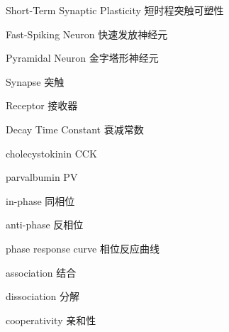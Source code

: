 \begin{denotation}

\item[Short-Term Synaptic Plasticity] 短时程突触可塑性
\item[Fast-Spiking Neuron] 快速发放神经元
\item[Pyramidal Neuron] 金字塔形神经元
\item[Synapse] 突触
\item[Receptor] 接收器
\item[Decay Time Constant] 衰减常数
\item[cholecystokinin] CCK
\item[parvalbumin] PV
\item[in-phase] 同相位
\item[anti-phase] 反相位
\item[phase response curve] 相位反应曲线
\item[association] 结合
\item[dissociation] 分解
\item[cooperativity] 亲和性
\end{denotation}
